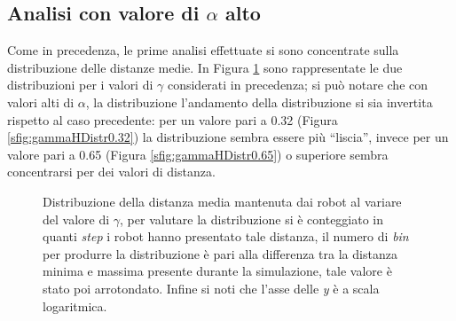 \subsection{Analisi con valore di $\alpha$ alto}
\label{subsec:gammaahigh}
Come in precedenza, le prime analisi effettuate si sono concentrate sulla distribuzione delle distanze medie.
In Figura \ref{fig:gammaHDistr} sono rappresentate le due distribuzioni per i valori di $\gamma$ considerati in precedenza; si può notare che con valori alti di $\alpha$, la distribuzione l'andamento della distribuzione si sia invertita rispetto al caso precedente: per un valore pari a 0.32 (Figura \ref{sfig:gammaHDistr0.32}) la distribuzione sembra essere più “liscia”, invece per un valore pari a 0.65 (Figura \ref{sfig:gammaHDistr0.65}) o superiore sembra concentrarsi per dei valori di distanza.
\begin{figure}
	\hfill
	\caption{Distribuzione della distanza media mantenuta dai robot al variare del valore di $\gamma$, per valutare la distribuzione si è conteggiato in quanti \textit{step} i robot hanno presentato tale distanza, il numero di \textit{bin} per produrre la distribuzione è pari alla differenza tra la distanza minima e massima presente durante la simulazione, tale valore è stato poi arrotondato. Infine si noti che l'asse delle \textit{y} è a scala logaritmica.}
	\label{fig:gammaHDistr}
\end{figure}
